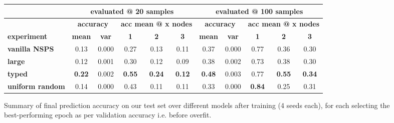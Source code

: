 \documentclass{article} %
\begin{document}
\begin{figure}[h]
        \begin{tabular}{|l|c|c|c|c|c|c|c|c|c|c|} \hline
        & \multicolumn{5}{|c|}{ \textbf{evaluated @ 20 samples} } & \multicolumn{5}{|c|}{ \textbf{evaluated @ 100 samples} } \\ \hline
        & \multicolumn{2}{|c|}{ \textbf{accuracy} } & \multicolumn{3}{|c|}{ \textbf{acc mean @ x nodes} } & \multicolumn{2}{|c|}{ \textbf{accuracy} } & \multicolumn{3}{|c|}{ \textbf{acc mean @ x nodes} } \\ \hline
        \textbf{experiment} & \textbf{mean} & \textbf{var} & \textbf{1} & \textbf{2} & \textbf{3} & \textbf{mean} & \textbf{var} & \textbf{1} & \textbf{2} & \textbf{3} \\ \hline
        \textbf{vanilla NSPS} & 0.13 & 0.000 & 0.27 & 0.13 & 0.11 & 0.37 & 0.000 & 0.77 & 0.36 & 0.30 \\ \hline
        \textbf{large} & 0.12 & 0.001 & 0.30 & 0.12 & 0.09 & 0.38 & 0.002 & 0.73 & 0.38 & 0.30 \\ \hline
        \textbf{typed} & \textbf{0.22} & 0.002 & \textbf{0.55} & \textbf{0.24} & \textbf{0.12} & \textbf{0.48} & 0.003 & 0.77 & \textbf{0.55} & \textbf{0.34} \\ \hline
        \textbf{uniform random} & 0.14 & 0.000 & 0.43 & 0.11 & 0.11 & 0.33 & 0.000 & \textbf{0.84} & 0.25 & 0.31 \\ \hline
    \end{tabular}
\caption{
    Summary of final prediction accuracy on our test set over different models after training (4 seeds each),
    for each selecting the best-performing epoch as per validation accuracy i.e. before overfit.
}
\label{fig:finalacc}
\end{figure}

\end{document}
